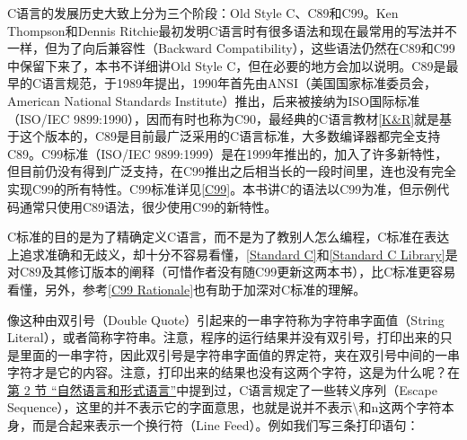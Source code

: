 \begin{BookNote}


C语言的发展历史大致上分为三个阶段：Old Style C、C89和C99。Ken Thompson和Dennis Ritchie最初发明C语言时有很多语法和现在最常用的写法并不一样，但为了向后兼容性（Backward Compatibility），这些语法仍然在C89和C99中保留下来了，本书不详细讲Old Style C，但在必要的地方会加以说明。C89是最早的C语言规范，于1989年提出，1990年首先由ANSI（美国国家标准委员会，American National Standards Institute）推出，后来被接纳为ISO国际标准（ISO/\BookSplit{}IEC 9899:\BookSplit{}1990），因而有时也称为C90，最经典的C语言教材\hyperlink{db.bi01.bibli.kr}{[K\&R]}就是基于这个版本的，C89是目前最广泛采用的C语言标准，大多数编译器都完全支持C89。C99标准（ISO/\BookSplit{}IEC 9899:\BookSplit{}1999）是在1999年推出的，加入了许多新特性，但目前仍没有得到广泛支持，在C99推出之后相当长的一段时间里，连也没有完全实现C99的所有特性。C99标准详见\hyperlink{db.bi01.bibli.c99}{[C99]}。本书讲C的语法以C99为准，但示例代码通常只使用C89语法，很少使用C99的新特性。



C标准的目的是为了精确定义C语言，而不是为了教别人怎么编程，C标准在表达上追求准确和无歧义，却十分不容易看懂，\hyperlink{db.bi01.bibli.standardc}{[Standard C]}和\hyperlink{db.bi01.bibli.standardclib}{[Standard C Library]}是对C89及其修订版本的阐释（可惜作者没有随C99更新这两本书），比C标准更容易看懂，另外，参考\hyperlink{db.bi01.bibli.rationale}{[C99 Rationale]}也有助于加深对C标准的理解。

\end{BookNote}


像这种由双引号（Double Quote）引起来的一串字符称为字符串字面值（String Literal），或者简称字符串。注意，程序的运行结果并没有双引号，打印出来的只是里面的一串字符，因此双引号是字符串字面值的界定符，夹在双引号中间的一串字符才是它的内容。注意，打印出来的结果也没有这两个字符，这是为什么呢？在\hyperlink{db.intro.naturalformal}{第 2 节 “自然语言和形式语言”}中提到过，C语言规定了一些转义序列（Escape Sequence），这里的并不表示它的字面意思，也就是说并不表示\textbackslash{}和n这两个字符本身，而是合起来表示一个换行符（Line Feed）。例如我们写三条打印语句：


